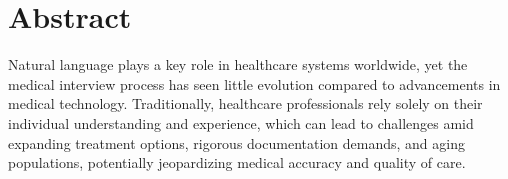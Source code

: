 

%
%


\chapter[abstract]{Abstract}



Natural language plays a key role in healthcare systems worldwide, yet the medical interview process has seen little evolution compared to advancements in medical technology.
Traditionally, healthcare professionals rely solely on their individual understanding and experience, which can lead to challenges amid expanding treatment options, rigorous documentation demands, and aging populations, potentially jeopardizing medical accuracy and quality of care.

